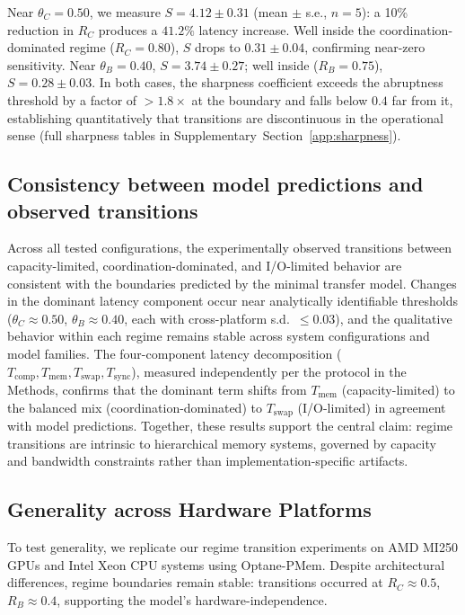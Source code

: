 Near $\theta_C = 0.50$, we measure $S = 4.12 \pm 0.31$ (mean $\pm$ s.e.,
$n=5$): a 10\% reduction in $R_C$ produces a $41.2\%$ latency increase.
Well inside the coordination-dominated regime ($R_C = 0.80$), $S$ drops to
$0.31 \pm 0.04$, confirming near-zero sensitivity.
Near $\theta_B = 0.40$, $S = 3.74 \pm 0.27$; well inside ($R_B = 0.75$),
$S = 0.28 \pm 0.03$.
In both cases, the sharpness coefficient exceeds the abruptness threshold
by a factor of $> 1.8\times$ at the boundary and falls below $0.4$ far
from it, establishing quantitatively that transitions are discontinuous in
the operational sense (full sharpness tables in
Supplementary~Section~\ref{app:sharpness}).

\subsection{Consistency between model predictions and observed transitions}
Across all tested configurations, the experimentally observed transitions
between capacity-limited, coordination-dominated, and I/O-limited behavior
are consistent with the boundaries predicted by the minimal transfer model.
Changes in the dominant latency component occur near analytically
identifiable thresholds ($\theta_C \approx 0.50$, $\theta_B \approx 0.40$,
each with cross-platform s.d.\ $\leq 0.03$), and the qualitative behavior
within each regime remains stable across system configurations and model
families.
The four-component latency decomposition
($T_{\mathrm{comp}}, T_{\mathrm{mem}}, T_{\mathrm{swap}}, T_{\mathrm{sync}}$),
measured independently per the protocol in the Methods, confirms that the
dominant term shifts from $T_{\mathrm{mem}}$ (capacity-limited) to the
balanced mix (coordination-dominated) to $T_{\mathrm{swap}}$ (I/O-limited)
in agreement with model predictions.
Together, these results support the central claim: regime transitions are
intrinsic to hierarchical memory systems, governed by capacity and bandwidth
constraints rather than implementation-specific artifacts.

\subsection{Generality across Hardware Platforms}
To test generality, we replicate our regime transition experiments on AMD MI250 GPUs and Intel Xeon CPU systems using Optane-PMem. Despite architectural differences, regime boundaries remain stable: transitions occurred at $R_C \approx 0.5$, $R_B \approx 0.4$, supporting the model's hardware-independence.

